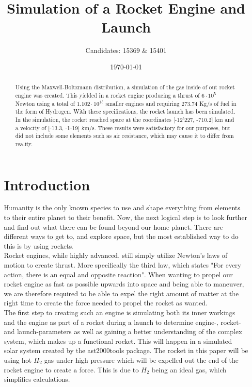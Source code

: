 \documentclass[reprint,english,notitlepage]{revtex4-2}
\begin{document}
\title{Simulation of a Rocket Engine and Launch}
\author{Candidates: 15369 \& 15401}
\date{\today}

\begin{abstract}
	Using the Maxwell-Boltzmann distribution, a simulation of the gas inside of out rocket engine was created.
	This yielded in a rocket engine producing a thrust of $6 \cdot 10^{5}$ Newton using a total of $1.102 \cdot 10^{15}$ smaller engines and requiring $273.74$ Kg/s of fuel in the form of Hydrogen.
	With these specifications, the rocket launch has been simulated.
	In the simulation, the rocket reached space at the coordinates [-12'227, -710.2] km and a velocity of [-13.3, -1-19] km/s.
	These results were satisfactory for our purposes, but did not include some elements such as air resistance, which may cause it to differ from reality.

\end{abstract}
\maketitle

\section{Introduction}
Humanity is the only known species to use and shape everything from elements to their entire planet to their benefit.
Now, the next logical step is to look further and find out what there can be found beyond our home planet.
There are different ways to get to, and explore space, but the most established way to do this is by using rockets.\\
Rocket engines, while highly advanced, still simply utilize Newton's laws of motion to create thrust.
More specifically the third law, which states "For every action, there is an equal and opposite reaction".
When wanting to propel our rocket engine as fast as possible upwards into space and being able to maneuver, we are therefore required
to be able to expel the right amount of matter at the right time to create the force needed to propel the rocket as wanted.\\
The first step to creating such an engine is simulating both its inner workings and the engine as part of a rocket during a launch to determine engine-, rocket- and launch-parameters
as well as gaining a better understanding of the complex system, which makes up a functional rocket. This will happen in a simulated solar system created by the ast2000tools package.
The rocket in this paper will be using hot $ H_2 $ gas under high pressure which will be expelled out the end of the rocket engine to create a force.
This is due to $H_2$ being an ideal gas, which simplifies calculations.
\end{document}
